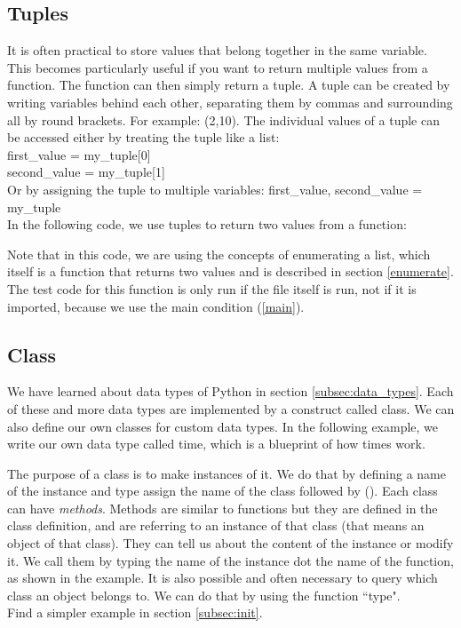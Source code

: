 \documentclass[10pt,a4paper]{article}
\begin{document}
\subsection{Tuples}
It is often practical to store values that belong together in the same variable. This becomes particularly useful if you want to return multiple values from a function. The function can then simply return a tuple. A tuple can be created by writing variables behind each other, separating them by commas and surrounding all by round brackets. For example:
(2,10).
The individual values of a tuple can be accessed either by treating the tuple like a list:\\
first\_value = my\_tuple[0]\\
second\_value = my\_tuple[1]
\\
Or by assigning the tuple to multiple variables:
first\_value, second\_value = my\_tuple
\\
In the following code, we use tuples to return two values from a function:

Note that in this code, we are using the concepts of enumerating a list, which      itself is a function that returns two values and is described in section \ref{enumerate}. The test code for this function is only run if the file itself is run, not if it is imported, because we use the main condition (\ref{main}).
\subsection{Class}
\label{class}
We have learned about data types of Python in section \ref{subsec:data_types}. Each of these and more data types are implemented by a construct called class. We can also define our own classes for custom data types. In the following example, we write our own data type called time, which is a blueprint of how times work.

The purpose of a class is to make instances of it. We do that by defining a name of the instance and type assign the name of the class followed by (). Each class can have \textit{methods}. Methods are similar to functions but they are defined in the class definition, and are referring to an instance of that class (that means an object of that class). They can tell us about the content of the instance or modify it. We call them by typing the name of the instance dot the name of the function, as shown in the example.
It is also possible and often necessary to query which class an object belongs to. We can do that by using the function ``type".
\\
Find a simpler example in section \ref{subsec:init}.
\end{document}
